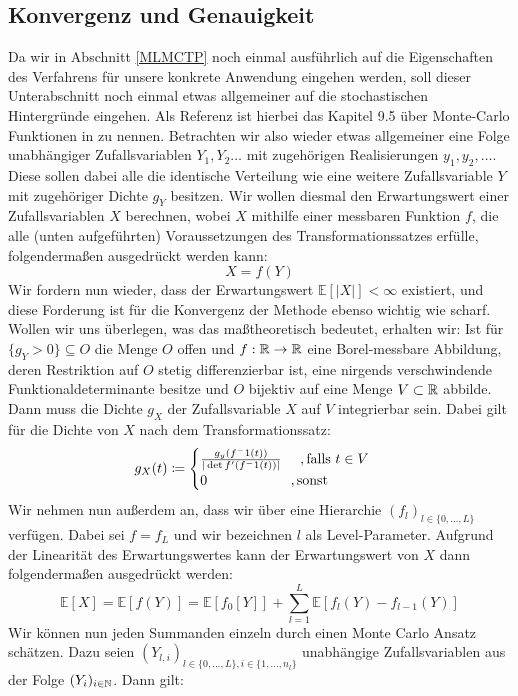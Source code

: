 \subsection{Konvergenz und Genauigkeit}
Da wir in Abschnitt \ref{MLMCTP} noch einmal ausführlich auf die Eigenschaften des Verfahrens für unsere konkrete Anwendung eingehen werden, soll dieser Unterabschnitt noch einmal etwas allgemeiner auf die stochastischen Hintergründe eingehen. Als Referenz ist hierbei das Kapitel 9.5 über Monte-Carlo Funktionen in \cite{sullivan2015introduction} zu nennen. 
Betrachten wir also wieder etwas allgemeiner eine Folge unabhängiger Zufallsvariablen $ Y_{1},Y_{2}\dots$ mit zugehörigen Realisierungen $ y_{1}, y_{2},\dots $. Diese sollen dabei alle die identische Verteilung wie eine weitere Zufallsvariable $ Y $ mit zugehöriger Dichte $ g_Y $ besitzen.
Wir wollen diesmal den Erwartungswert einer Zufallsvariablen $ X $ berechnen, wobei $ X $ mithilfe einer messbaren Funktion $ f $, die alle (unten aufgeführten) Voraussetzungen des Transformationssatzes erfülle, folgendermaßen ausgedrückt werden kann:
\[
	X = f(Y)
\]
Wir fordern nun wieder, dass der Erwartungswert $ \mathbb{E}[|X|] < \infty $ existiert, und diese Forderung ist für die Konvergenz der Methode ebenso wichtig wie scharf. Wollen wir uns überlegen, was das maßtheoretisch bedeutet, erhalten wir:
Ist für  $  \{ g_Y > 0 \} \subseteq O $ die Menge $ O $ offen und $ f:\mathbb{R} \to \mathbb{R} $ eine Borel-messbare Abbildung, deren Restriktion auf $ O $ stetig differenzierbar ist, eine nirgends verschwindende Funktionaldeterminante besitze und $ O $ bijektiv auf eine Menge $ V \subset \mathbb{R} $ abbilde.
Dann muss die Dichte $ g_X $ der Zufallsvariable $ X $ auf $ V $ integrierbar sein. Dabei gilt für die Dichte von $ X $ nach dem Transformationssatz:
\[
 	g_X(t) \coloneqq 
 	\begin{cases}
 	\frac{g_y(f^-1(t))}{| \det f'(f^-1(t)) |} \ \quad ,\text{falls }t\in V\\
 	0 \qquad \qquad \qquad, \text{sonst} 	
 	\end{cases}
\]
Wir nehmen nun außerdem an, dass wir über eine Hierarchie 
$ (f_l)_{l \in \{ 0,\dots,L \} } $ verfügen. Dabei sei $ f = f_L $ und wir bezeichnen $ l $ als Level-Parameter.
Aufgrund der Linearität des Erwartungswertes kann der Erwartungswert von $ X $ dann folgendermaßen ausgedrückt werden:
\[
	\mathbb{E}[X] = \mathbb{E}[f(Y)] = \mathbb{E}[f_0[Y]] + \sum_{l=1}^{L} \mathbb{E}[f_l(Y) - f_{l-1}(Y)]
\]
Wir können nun jeden Summanden einzeln durch einen Monte Carlo Ansatz schätzen. Dazu seien $ (Y_{l,i})_{l\in\{0,\dots,L\},i \in \{1,\dots,n_l \} }  $ unabhängige Zufallsvariablen aus der Folge $ (Y_i)_{i \in \mathbb{N}} $. Dann gilt:
